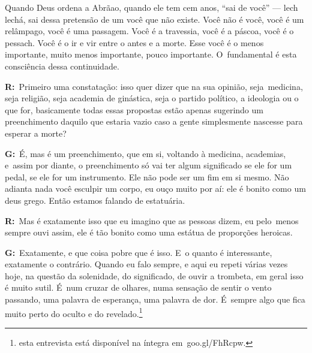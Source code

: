  

Quando Deus ordena a Abrãao, quando ele tem cem anos, ``sai de você''
--- lech lechá, sai dessa pretensão de um você que não existe. Você não
é você, você é um relâmpago, você é uma passagem. Você é a travessia,
você é a páscoa, você é o pessach. Você é o ir e vir entre o antes e a
morte. Esse você é o menos importante, muito menos importante, pouco
importante. O~fundamental é esta consciência dessa continuidade.

 

\textbf{R:}~Primeiro uma constatação: isso quer dizer que na sua
opinião, seja\textbf{}~medicina, seja religião, seja academia de
ginástica, seja o partido político, a ideologia ou o que for,
basicamente todas essas propostas estão apenas sugerindo um
preenchimento daquilo que estaria vazio caso a gente simplesmente
nascesse para esperar a morte?

 

\textbf{G:}~É, mas é um preenchimento, que em si, voltando à medicina,
academias, e\textbf{}~assim por diante, o preenchimento só vai ter algum
significado se ele for um pedal, se ele for um instrumento. Ele não pode
ser um fim em si mesmo. Não adianta nada você esculpir um corpo, eu ouço
muito por aí: ele é bonito como um deus grego. Então estamos falando de
estatuária.

 

\textbf{R:}~Mas é exatamente isso que eu imagino que as pessoas dizem,
eu pelo\textbf{}~menos sempre ouvi assim, ele é tão bonito como uma
estátua de proporções heroicas.

 

\textbf{G:}~Exatamente, e que coisa pobre que é isso. E~o quanto é
interessante, exatamente o contrário. Quando eu falo sempre, e aqui eu
repeti várias vezes hoje, na questão da solenidade, do significado, de
ouvir a trombeta, em geral isso é muito sutil. É~num cruzar de olhares,
numa sensação de sentir o vento passando, uma palavra de esperança, uma
palavra de dor. É~sempre algo que fica muito perto do oculto e do
revelado.\footnote{esta entrevista está disponível na íntegra em~goo.gl/FhRcpw.} 

\fechafala 

